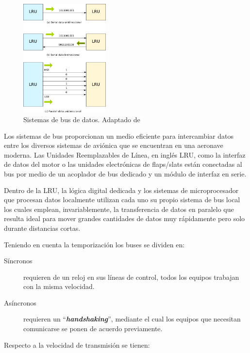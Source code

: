 \begin{figure}[!htb]
  \centering
  \includegraphics[width=0.4\textwidth]{01.tablero.instrumentos/U01.imagenes/U01.5.protocolos.buses.datos/01_Uni_bi_paralelo_datos.png}
  \caption{Sistemas de bus de datos. Adaptado de \protect\cite{tooley2013aircraft}}
  \label{fig:01.sistemas.bus.datos}
\end{figure}


Los sistemas de bus proporcionan un medio eficiente para intercambiar datos entre los diversos sistemas de aviónica que se encuentran en una aeronave moderna.
Las Unidades Reemplazables de Línea, en ingl\'es  \ac{LRU}, como la interfaz de datos del motor o las unidades electrónicas de flaps/slats están conectadas al bus por medio de un acoplador de bus dedicado y un módulo de interfaz en serie.

Dentro de la \ac{LRU}, la lógica digital dedicada y los sistemas de microprocesador que procesan datos localmente utilizan cada uno su propio sistema de bus local los cuales emplean, invariablemente, la transferencia de datos en paralelo que resulta ideal para mover grandes cantidades de datos muy rápidamente pero solo durante distancias cortas.

Teniendo en cuenta la temporización los buses se dividen en:
\begin{description}
\item[Síncronos] requieren de un reloj en sus líneas de control, todos los equipos trabajan con la misma velocidad.
\item[Asíncronos] requieren un ``{\it \bf handshaking}'', mediante el cual los equipos que necesitan comunicarse se ponen de acuerdo previamente.

\end{description}

Respecto a la velocidad de transmisión se tienen:

